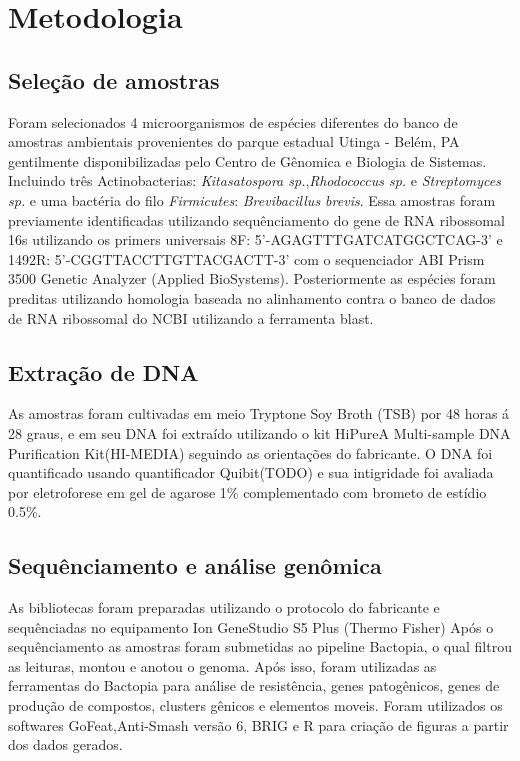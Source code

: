 \section{Metodologia}
\subsection{Seleção de amostras}
Foram selecionados 4 microorganismos de espécies diferentes do banco de amostras ambientais provenientes
do parque estadual Utinga - Belém, PA gentilmente disponibilizadas pelo Centro de Gênomica e Biologia de Sistemas.
Incluindo três Actinobacterias: \textit{Kitasatospora sp.},\textit{Rhodococcus sp.} e \textit{Streptomyces sp.}
e uma bactéria do filo \textit{Firmicutes}: \textit{Brevibacillus brevis}.
Essa amostras foram previamente identificadas utilizando sequênciamento do gene de RNA ribossomal 16s
utilizando os primers universais 8F: 5'-AGAGTTTGATCATGGCTCAG-3' e 1492R: 5'-CGGTTACCTTGTTACGACTT-3' com o sequenciador 
ABI Prism 3500 Genetic Analyzer (Applied BioSystems). Posteriormente as espécies foram preditas utilizando
homologia baseada no alinhamento contra o banco de dados de RNA ribossomal do NCBI utilizando a ferramenta
blast.

\subsection{Extração de DNA}
As amostras foram cultivadas em meio Tryptone Soy Broth (TSB) por 48 horas á 28 graus, e em
seu DNA foi extraído utilizando o kit HiPureA Multi-sample DNA Purification Kit(HI-MEDIA) seguindo as orientações
do fabricante. O DNA foi quantificado usando quantificador Quibit(TODO) e sua intigridade foi 
avaliada por eletroforese em gel de agarose 1\% complementado com brometo de estídio 0.5\%.

\subsection{Sequênciamento e análise genômica}
As bibliotecas foram preparadas utilizando o protocolo do fabricante e sequênciadas no equipamento
Ion GeneStudio S5 Plus (Thermo Fisher)
Após o sequênciamento as amostras foram submetidas ao pipeline Bactopia, o qual filtrou
as leituras, montou e anotou o genoma. Após isso, foram utilizadas as ferramentas do Bactopia 
para análise de resistência, genes patogênicos, genes de produção de compostos, clusters
gênicos e elementos moveis. 
Foram utilizados os softwares GoFeat,Anti-Smash versão 6, BRIG e R para criação de figuras a partir dos dados gerados.
